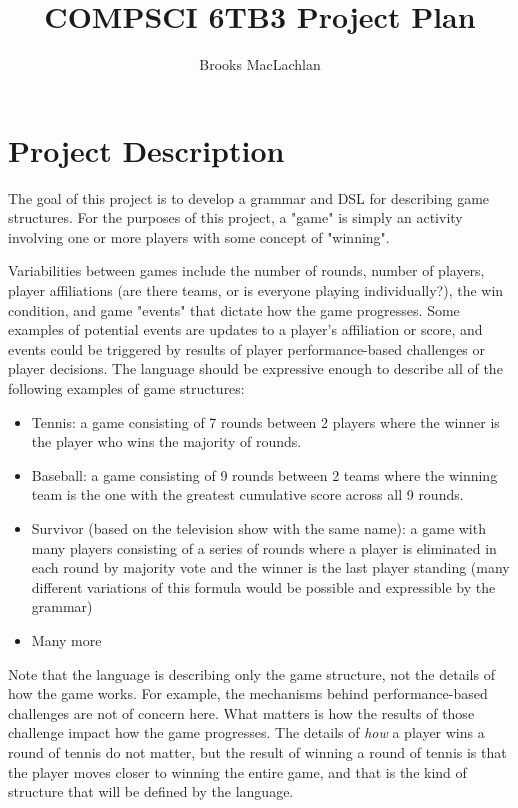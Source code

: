 \documentclass[12pt]{article}
\title{COMPSCI 6TB3 Project Plan}
\author{Brooks MacLachlan}
\begin{document}
	\maketitle
	
	\section{Project Description}
	
	The goal of this project is to develop a grammar and DSL for describing 
	game structures. For the purposes of this project, a "game" is simply an 
	activity involving one or more players with some concept of "winning". 
	
	Variabilities between games include the number of rounds, number of 
	players, player affiliations (are there teams, or is everyone playing 
	individually?), the win condition, and game "events" that dictate how the 
	game progresses. Some examples of potential events are updates to a 
	player's affiliation or score, and events could be triggered by results of 
	player performance-based challenges or player decisions. The language 
	should be expressive enough to  describe all of the following examples of 
	game structures:
	
	\begin{itemize}
		\item Tennis: a game consisting of 7 rounds between 2 players where the 
		winner is the player who wins the majority of rounds.
		\item Baseball: a game consisting of 9 rounds between 2 teams where the 
		winning team is the one with the greatest cumulative score across all 9 
		rounds.
		\item Survivor (based on the television show with the same name): a 
		game with many players consisting of a series of rounds where a player 
		is eliminated in each round by majority vote and the winner is the last 
		player standing (many different variations of this formula would be 
		possible and expressible by the grammar)
		\item Many more
	\end{itemize}
	
	Note that the language is describing only the game structure, not the 
	details of how the game works. For example, the mechanisms behind 
	performance-based challenges are not of concern here. What matters is how 
	the results of those challenge impact how the game progresses. The details 
	of \textit{how} a player wins a round of tennis do not matter, but the 
	result of winning a round of tennis is that the player moves closer to 
	winning the entire game, and that is the kind of structure that will be 
	defined by the language.
	
\end{document}
